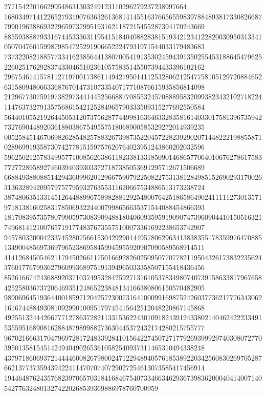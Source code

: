 \documentclass[10pt,
b5paper,
fleqn,
dvipdfmx,
uplatex
]{jsarticle}
\begin{document}
277154220166299548631303249123110296279237238997664\\16803497141226527931907636326136814145516376656559839788489381733082668779901962886932296597379951931621187215455287394170243669\\88559388879331674453336311954151840408828381519342123412282003095031334105070476015998798547252919066522247931971544033179483683\\73732208218857733416238564413807005419135302459439135025545318864547962522602517629283743304651023610575835145507394433396102162\\29675461415781127197001738611494279501411253280621254775810512972088465263158094806633687670147310733540717710876615935856814098\\21296773075919738297344144525668877085532457088895832099382343210271822411476373279135756861542125284965790333509315277692550584\\56440105521926445053120737562877449981636463328358161403301758139673594273276904489203618803867549557518068900585329272014939235\\00525845146706982628548257883267398735220457228239290207144822219885587102896991935873074277815159757620764023951243860202032596\\59625021257834995771008562638611823381331850901468657706401067627861758377277289589274603940393033727187385053691295712671506689\\66884938808851429436099620129667590792250822753138128498515269029317002631363289420957975779593276355311620667534886513173238724\\38748063513314512644889967589828812925480076425186586490241111127301357197181381602583178506932244007998656635371544088454866393\\18170839573578079905973083909488180406093595919090747396090441015051632174968141210076571917748376735575100073361692238653742907\\94578032000423374528075661530429290144957806296341383835517835997647088513490048569736979652386958459945955920907090589568914511\\41412684505462117945026611750166928260250950770778211950432617383223562437601776799362796099368975191394965033358507155418436456\\85261667424368892037103749532842592713161053783498074073915863381796765842525803673720646935124865223848134166380806150570482905\\98906964519364400185971204257230073164100099169875242603773621777634306216167448849308109299010095179745415642512048220867145868\\49255132444266777127863728211331536224301091824391243380214046242223349153559516890816288487989988273630445372432174280215755777\\96702166631704796972817248339284101564227450727177926939992974030807277039501358154514249404902653610582540937311465310494338248\\43797186069372144446008267980024712294894057618538922034256083026970528766213773735943942241147070740729027254613073585417456914\\1944648762435768239706570318416846754073346634629367398362000404140071405427763248013274220268539369886978760700959
\end{document}
